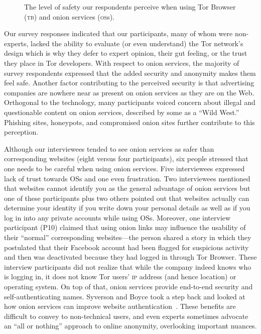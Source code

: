 \begin{figure}[t]
    \centering
    
    \caption{The level of safety our respondents perceive when using Tor
    Browser (\textsc{tb}) and onion services (\textsc{os}s).}
    \label{fig:perceived-security}
\end{figure}

Our survey responses indicated that our participants, many of whom were
non-experts,  lacked the ability to evaluate (or even understand)
the Tor network's design which is why they defer to expert opinion, their gut
feeling, or the trust they place in Tor developers.  With respect to onion
services, the majority of survey respondents expressed that the added security
and anonymity makes them feel safe.  Another factor contributing to the
perceived security is that advertising companies are nowhere near as present on
onion services as they are on the Web.  Orthogonal to the technology, many
participants voiced concern about illegal and questionable content on onion
services, described by some as a ``Wild West.''  Phishing sites, honeypots, and
compromised onion sites further contribute to this perception.

Although our interviewees tended to see onion services as safer than
corresponding websites (eight versus four participants), six people stressed
that one needs to be careful when using onion services.  Five interviewees
expressed lack of trust towards OSs and one even frustration.  Two interviewees
mentioned that websites cannot identify you as the general advantage of onion
services but one of these participants plus two others pointed out that websites
actually can determine your identity if you write down your personal details as
well as if you log in into any private accounts while using OSs. Moreover, one
interview participant (P10) claimed that using onion links may influence the
usability of their ``normal'' corresponding websites---the person shared a story
in which they postulated that their Facebook account had been flagged for
suspicious activity and then was deactivated because they had logged in through
Tor Browser.  These interview participants did not realize that while the
company indeed knows who is logging in, it does not know Tor users' \textsc{ip}
address (and hence location) or operating system.  On top of that, onion
services provide end-to-end security and self-authenticating names.  Syverson
and Boyce took a step back and looked at how onion services can improve website
authentication~\cite{Syverson2015a}.  These benefits are difficult to convey to
non-technical users, and even experts sometimes advocate an ``all or nothing''
approach to online anonymity, overlooking important nuances.

